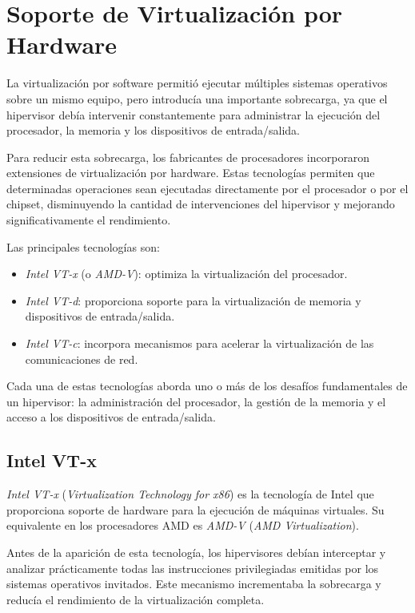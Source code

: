 \section{Soporte de Virtualización por Hardware}

La virtualización por software permitió ejecutar múltiples sistemas operativos sobre un mismo equipo, pero introducía una importante sobrecarga, ya que el hipervisor debía intervenir constantemente para administrar la ejecución del procesador, la memoria y los dispositivos de entrada/salida.

Para reducir esta sobrecarga, los fabricantes de procesadores incorporaron extensiones de virtualización por hardware. Estas tecnologías permiten que determinadas operaciones sean ejecutadas directamente por el procesador o por el chipset, disminuyendo la cantidad de intervenciones del hipervisor y mejorando significativamente el rendimiento.

Las principales tecnologías son:
\begin{itemize}
  \item \textit{Intel VT-x} (o \textit{AMD-V}): optimiza la virtualización del procesador.
  \item \textit{Intel VT-d}: proporciona soporte para la virtualización de memoria y dispositivos de entrada/salida.
  \item \textit{Intel VT-c}: incorpora mecanismos para acelerar la virtualización de las comunicaciones de red.
\end{itemize}

Cada una de estas tecnologías aborda uno o más de los desafíos fundamentales de un hipervisor: la administración del procesador, la gestión de la memoria y el acceso a los dispositivos de entrada/salida.

\subsection{Intel VT-x}

\textit{Intel VT-x} (\textit{Virtualization Technology for x86}) es la tecnología de Intel que proporciona soporte de hardware para la ejecución de máquinas virtuales. Su equivalente en los procesadores AMD es \textit{AMD-V} (\textit{AMD Virtualization}).

Antes de la aparición de esta tecnología, los hipervisores debían interceptar y analizar prácticamente todas las instrucciones privilegiadas emitidas por los sistemas operativos invitados. Este mecanismo incrementaba la sobrecarga y reducía el rendimiento de la virtualización completa.

